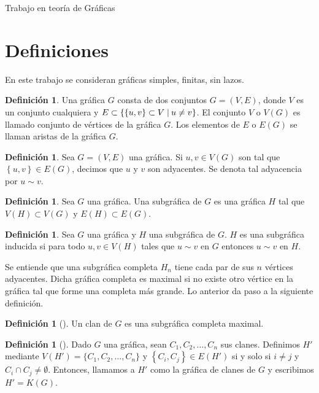 \documentclass[12pt]{book}
\theoremstyle{definition}
\newtheorem{definition}[theorem]{Definición}
\newcommand{\set}[2]{\{#1\nonscript\;\vert\allowbreak\nonscript\:\mathopen{}#2\}}
\begin{document}
\begin{titlepage}

	\vfill

	{\LARGE Trabajo en teoría de Gráficas}\\[2cm]

	\vfill
\end{titlepage}
\section*{Definiciones}
En este trabajo se consideran gráficas simples, finitas, sin lazos.
\begin{definition}
Una gráfica $G$ consta de dos conjuntos $G=(V,E)$, donde $V$ es un conjunto cualquiera y $E\subset \set{\left\{u,v\right\}\subset V}{u\neq v}$. El conjunto $V$ o $V(G)$ es llamado conjunto de vértices de la gráfica $G$. Los elementos de $E$ o $E(G)$ se llaman aristas de la gráfica $G$.
\end{definition}

\begin{definition}
Sea $G=(V,E)$ una gráfica. Si $u,v\in V(G)$ son tal que $\left\{u,v\right\}\in E(G)$, decimos que $u$ y $v$ son adyacentes. Se denota tal adyacencia por $u\sim v$.
\end{definition}

\begin{definition}
Sea $G$ una gráfica. Una subgráfica de $G$ es una gráfica $H$ tal que $V(H)\subset V(G)$ y $E(H)\subset E(G)$.
\end{definition}

\begin{definition}
Sea $G$ una gráfica y $H$ una subgráfica de $G$. $H$ es una subgráfica inducida si para todo $u,v\in V(H)$ tales que $u\sim v$ en $G$ entonces $u\sim v$ en $H$.
\end{definition}

Se entiende que una subgráfica completa $H_n$ tiene cada par de sus $n$ vértices adyacentes. Dicha gráfica completa es maximal si no existe otro vértice en la gráfica tal que forme una completa más grande. Lo anterior da paso a la siguiente definición.

\begin{definition}[\citealt{Harary:1969}]
Un clan de $G$ es una subgráfica completa maximal. 
\end{definition}

\begin{definition}[\citealt{Roberts:1971}]
Dado $G$ una gráfica, sean $C_1, C_2, \dots, C_n $ sus clanes. Definimos $H'$ mediante $ V(H') = \{C_1, C_2, \dots, C_n\}$ y $\left\{C_i, C_j\right\}\in E(H')$ si y solo si $i \neq j$ y $C_i \cap C_j \neq \emptyset$.  
Entonces, llamamos a $H'$ como la gráfica de clanes de $G$ y escribimos $H'=K(G)$.
\end{definition}
\end{document}
